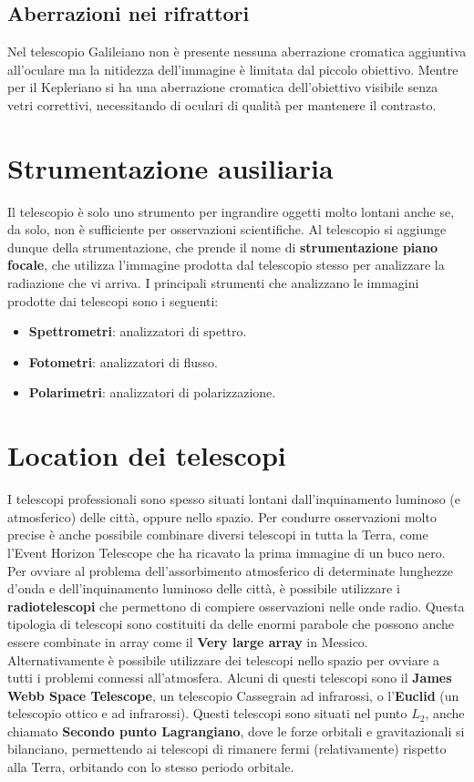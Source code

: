 \documentclass[a4paper, oneside]{book}
\begin{document}
\subsection{Aberrazioni nei rifrattori}
Nel telescopio Galileiano non è presente nessuna aberrazione cromatica aggiuntiva all'oculare ma la nitidezza dell'immagine è
limitata dal piccolo obiettivo. Mentre per il Kepleriano si ha una aberrazione cromatica dell'obiettivo visibile senza
vetri correttivi, necessitando di oculari di qualità per mantenere il contrasto. 

\clearpage
\section{Strumentazione ausiliaria}
Il telescopio è solo uno strumento per ingrandire oggetti molto lontani anche se, da solo,
non è sufficiente per osservazioni scientifiche. Al telescopio si aggiunge dunque della strumentazione,
che prende il nome di \textbf{strumentazione piano focale}, che utilizza l'immagine prodotta dal telescopio stesso
per analizzare la radiazione che vi arriva. I principali strumenti che analizzano le immagini prodotte
dai telescopi sono i seguenti:
\begin{itemize}
    \item \textbf{Spettrometri}: analizzatori di spettro.
    \item \textbf{Fotometri}: analizzatori di flusso.
    \item \textbf{Polarimetri}: analizzatori di polarizzazione.
\end{itemize}

\section{Location dei telescopi}
I telescopi professionali sono spesso situati lontani dall'inquinamento luminoso (e atmosferico)
delle città, oppure nello spazio. Per condurre osservazioni molto precise è anche possibile combinare
diversi telescopi in tutta la Terra, come l'Event Horizon Telescope che ha ricavato la prima
immagine di un buco nero. Per ovviare al problema dell'assorbimento atmosferico di 
determinate lunghezze d'onda e dell'inquinamento luminoso delle città, è possibile utilizzare i \textbf{radiotelescopi} che permettono di compiere osservazioni nelle onde radio. Questa tipologia di telescopi sono
costituiti da delle enormi parabole che possono anche essere combinate in array come il \textbf{Very large array} in Messico.
Alternativamente è possibile utilizzare dei telescopi nello spazio per ovviare a tutti i problemi connessi 
all'atmosfera. Alcuni di questi telescopi sono il \textbf{James Webb Space Telescope}, un telescopio Cassegrain ad infrarossi, 
o l'\textbf{Euclid} (un telescopio ottico e ad infrarossi). Questi telescopi sono situati nel punto $L_2$, anche chiamato \textbf{Secondo punto Lagrangiano}, 
dove le forze orbitali e gravitazionali si bilanciano, permettendo ai telescopi di rimanere fermi (relativamente) 
rispetto alla Terra, orbitando con lo stesso periodo orbitale. 
\end{document}

